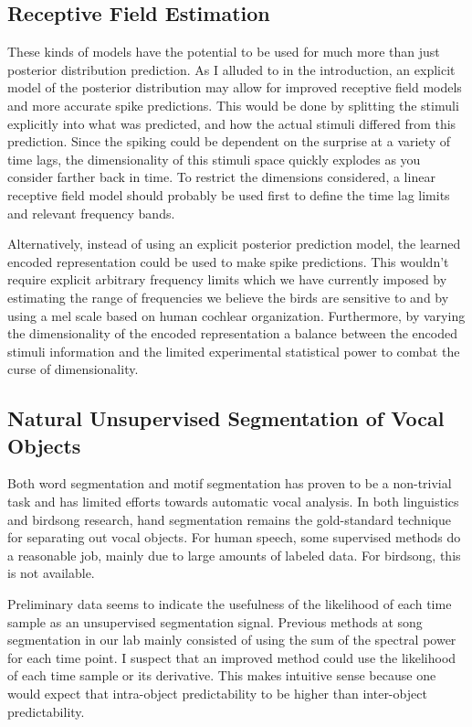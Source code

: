 \subsection{Receptive Field Estimation}
These kinds of models have the potential to be used for much more than just posterior distribution prediction. As I alluded to in the introduction, an explicit model of the posterior distribution may allow for improved receptive field models and more accurate spike predictions. This would be done by splitting the stimuli explicitly into what was predicted, and how the actual stimuli differed from this prediction. Since the spiking could be dependent on the surprise at a variety of time lags, the dimensionality of this stimuli space quickly explodes as you consider farther back in time. To restrict the dimensions considered, a linear receptive field model should probably be used first to define the time lag limits and relevant frequency bands.

Alternatively, instead of using an explicit posterior prediction model, the learned \CPC encoded representation could be used to make spike predictions. This wouldn't require explicit arbitrary frequency limits which we have currently imposed by estimating the range of frequencies we believe the birds are sensitive to and by using a mel scale based on human cochlear organization. Furthermore, by varying the dimensionality of the \CPC encoded representation a balance between the encoded stimuli information and the limited experimental statistical power to combat the curse of dimensionality.

\subsection{Natural Unsupervised Segmentation of Vocal Objects}
Both word segmentation and motif segmentation has proven to be a non-trivial task and has limited efforts towards automatic vocal analysis. In both linguistics and birdsong research, hand segmentation remains the gold-standard technique for separating out vocal objects. For human speech, some supervised methods do a reasonable job, mainly due to large amounts of labeled data. For birdsong, this is not available.

Preliminary data seems to indicate the usefulness of the likelihood of each time sample as an unsupervised segmentation signal. Previous methods at song segmentation in our lab mainly consisted of using the sum of the spectral power for each time point. I suspect that an improved method could use the likelihood of each time sample or its derivative. This makes intuitive sense because one would expect that intra-object predictability to be higher than inter-object predictability.

